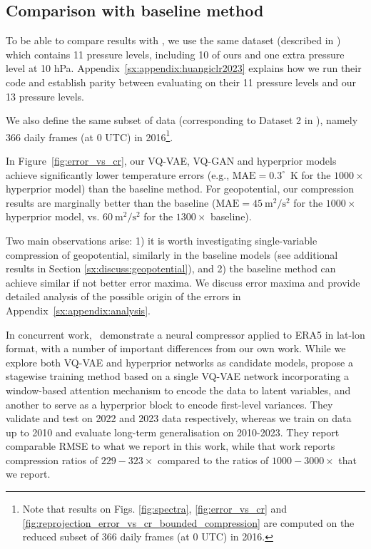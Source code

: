 \documentclass[11pt, a4paper, logo, copyright, numbering]{googledeepmind}
\begin{document}
\subsection{Comparison with baseline method}

To be able to compare results with \cite{huang2022compressing}, we use the same dataset (described in \cite{ashkboos2022ens}) which contains 11 pressure levels, including 10 of ours and one extra pressure level at 10 hPa. Appendix~\ref{sx:appendix:huangiclr2023} explains how we run their code and establish parity between evaluating on their 11 pressure levels and our 13 pressure levels.

We also define the same subset of data (corresponding to Dataset 2 in \citet{huang2022compressing}), namely 366 daily frames (at 0 UTC) in 2016\footnote{Note that results on Figs. \ref{fig:spectra}, \ref{fig:error_vs_cr} and \ref{fig:reprojection_error_vs_cr_bounded_compression} are computed on the reduced subset of 366 daily frames (at 0 UTC) in 2016.}.

In Figure~\ref{fig:error_vs_cr}, our VQ-VAE, VQ-GAN and hyperprior models achieve significantly lower temperature errors (e.g., $\text{MAE}=0.3^\circ$~K for the $1000 \times$ hyperprior model) than the baseline method. For geopotential, our compression results are marginally better than the baseline ($\text{MAE}=45~\text{m}^2/\text{s}^2$ for the $1000 \times$ hyperprior model, vs. $60~\text{m}^2/\text{s}^2$ for the $1300 \times$ baseline).

Two main observations arise: 1) it is worth investigating single-variable compression of geopotential, similarly in the baseline models (see additional results in Section \ref{sx:discuss:geopotential}), and 2) the baseline method can achieve similar if not better error maxima. We discuss error maxima and provide detailed analysis of the possible origin of the errors in Appendix~\ref{sx:appendix:analysis}.

In concurrent work,~\citet{han2024cra5} demonstrate a neural compressor applied to ERA5 in lat-lon format, with a number of important differences from our own work. While we explore both VQ-VAE and hyperprior networks as candidate models, \citet{han2024cra5} propose a stagewise training method based on a single VQ-VAE network incorporating a window-based attention mechanism to encode the data to latent variables, and another to serve as a hyperprior block to encode first-level variances.
They validate and test on 2022 and 2023 data respectively, whereas we train on data up to 2010 and evaluate long-term generalisation on 2010-2023.
They report comparable RMSE to what we report in this work, while that work reports compression ratios of $229-323\times$ compared to the ratios of $1000-3000\times$ that we report.
\end{document}
